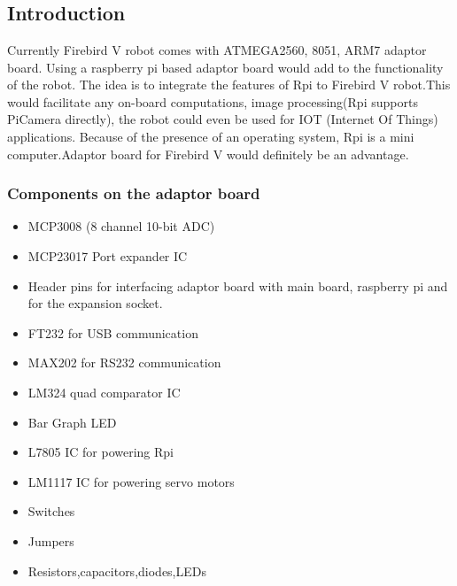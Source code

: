 \documentclass[a4paper,12pt,oneside]{book}
\begin{document}
\pagestyle{fancy}
\fancyhf{}
\tableofcontents{}
\pagebreak
\chapter{}
\section{\textbf{Introduction}}

Currently Firebird V robot comes with ATMEGA2560, 8051, ARM7 adaptor board. Using a raspberry pi based adaptor board would add to the functionality of the robot. The idea is to integrate the features of Rpi to Firebird V robot.This would facilitate any on-board computations, image processing(Rpi supports PiCamera directly), the robot could even be used for IOT (Internet Of Things) applications. Because of the presence of an operating system, Rpi is a mini computer.Adaptor board for Firebird V would definitely be an advantage.\\
\hfill

\subsection{\textbf{Components on the adaptor board}}
\vspace{1cm}
\begin{itemize}
	\item{MCP3008 (8 channel 10-bit ADC)}
	\item{MCP23017 Port expander IC}
	\item{Header pins for interfacing adaptor board with main board, raspberry pi and for the expansion socket.}
	\item{FT232 for USB communication}	
	\item{MAX202 for RS232 communication}
	\item{LM324 quad comparator IC}
	\item{Bar Graph LED}
	\item{L7805 IC for powering Rpi}
	\item{LM1117 IC for powering servo motors}
	\item{Switches}
    \item{Jumpers}
    \item{Resistors,capacitors,diodes,LEDs}	
\end{itemize}
\pagebreak
\end{document}
